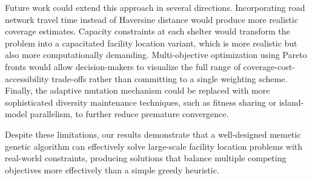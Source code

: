 \documentclass[12pt]{article}
\begin{document}
Future work could extend this approach in several directions. Incorporating road network travel time instead of Haversine distance would produce more realistic coverage estimates. Capacity constraints at each shelter would transform the problem into a capacitated facility location variant, which is more realistic but also more computationally demanding. Multi-objective optimization using Pareto fronts would allow decision-makers to visualize the full range of coverage-cost-accessibility trade-offs rather than committing to a single weighting scheme. Finally, the adaptive mutation mechanism could be replaced with more sophisticated diversity maintenance techniques, such as fitness sharing or island-model parallelism, to further reduce premature convergence.

Despite these limitations, our results demonstrate that a well-designed memetic genetic algorithm can effectively solve large-scale facility location problems with real-world constraints, producing solutions that balance multiple competing objectives more effectively than a simple greedy heuristic.


\end{document}
